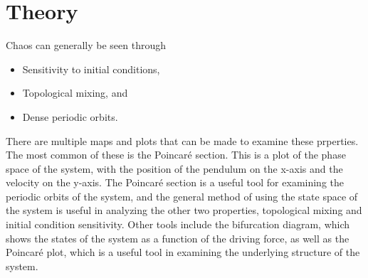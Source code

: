 \documentclass[11pt]{article} %
\begin{document}
\section{Theory}
    Chaos can generally be seen through
    \begin{itemize}
        \item Sensitivity to initial conditions,
        \item Topological mixing, and
        \item Dense periodic orbits.
    \end{itemize}
    There are multiple maps and plots that can be made to examine these prperties. 
    The most common of these is the Poincar\'e section. This is a plot of the phase 
    space of the system, with the position of the pendulum on the x-axis and the velocity 
    on the y-axis. The Poincar\'e section is a useful tool for examining the periodic 
    orbits of the system, and the general method of using the state space of the system 
    is useful in analyzing the other two properties, topological mixing and initial condition
    sensitivity. Other tools include the bifurcation diagram, which shows the states of the
    system as a function of the driving force, as well as the Poincar\'e plot, which is a useful
    tool in examining the underlying structure of the system. \cite{Strogatz2000}\\
\end{document}
